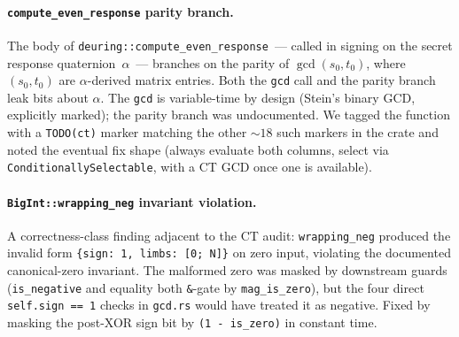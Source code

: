 \paragraph{\texttt{compute\_even\_response} parity branch.}
The body of \texttt{deuring::compute\_even\_response}~--- called
in signing on the secret response quaternion~$\alpha$~--- branches
on the parity of $\gcd(s_0, t_0)$, where $(s_0, t_0)$ are
$\alpha$-derived matrix entries.  Both the \texttt{gcd} call and
the parity branch leak bits about $\alpha$.  The
\texttt{gcd} is variable-time by design (Stein's binary GCD,
explicitly marked); the parity branch was undocumented.  We
tagged the function with a \texttt{TODO(ct)} marker matching
the other ${\sim}18$ such markers in the crate and noted
the eventual fix shape (always evaluate both columns, select
via \texttt{ConditionallySelectable}, with a CT GCD once one
is available).

\paragraph{\texttt{BigInt::wrapping\_neg} invariant violation.}
A correctness-class finding adjacent to the CT audit:
\texttt{wrapping\_neg} produced the invalid form
\texttt{\{sign: 1, limbs: [0; N]\}} on zero input, violating the
documented canonical-zero invariant.  The malformed zero was
masked by downstream guards (\texttt{is\_negative} and
equality both \texttt{\&}-gate by \texttt{mag\_is\_zero}), but
the four direct \texttt{self.sign == 1} checks in
\texttt{gcd.rs} would have treated it as negative.  Fixed by
masking the post-XOR sign bit by \texttt{(1 - is\_zero)} in
constant time.
